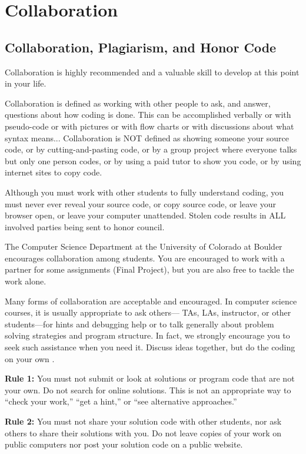 \section{Collaboration}

\subsection{Collaboration, Plagiarism, and Honor Code}

Collaboration is highly recommended and a valuable skill to develop at this point in your life.

Collaboration is defined as working with other people to ask, and answer, questions about how coding is done. This can be accomplished verbally or with pseudo-code or with pictures or with flow charts or with discussions about what syntax means... Collaboration is NOT defined as showing someone your source code, or by cutting-and-pasting code, or by a group project where everyone talks but only one person codes, or by using a paid tutor to show you code, or by using internet sites to copy code.

Although you must work with other students to fully understand coding, you must never ever reveal your source code, or copy source code, or leave your browser open, or leave your computer unattended. Stolen code results in ALL involved parties being sent to honor council.

The Computer Science Department at the University of Colorado at Boulder encourages collaboration among students. You are encouraged to work with a partner for some assignments (Final Project), but you are also free to tackle the work alone.

Many forms of collaboration are acceptable and encouraged. In computer science courses, it is usually appropriate to ask others— TAs, LAs, instructor, or other students—for hints and debugging help or to talk generally about problem solving strategies and program structure. In fact, we strongly encourage you to seek such assistance when you need it. Discuss ideas together, but do the coding on your own .

\textbf{Rule 1: }You must not submit or look at solutions or program code that are not your own. Do not search for online solutions. This is not an appropriate way to “check your work,” “get a hint,” or “see alternative approaches.”

\textbf{Rule 2: }You must not share your solution code with other students, nor ask others to share their solutions with you. Do not leave copies of your work on public computers nor post your solution code on a public website.

